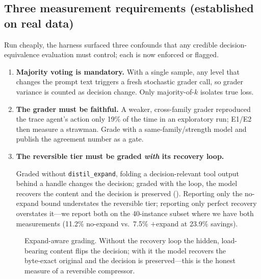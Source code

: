 \documentclass[11pt]{article}
\begin{document}
\subsection{Three measurement requirements (established on real data)}
Run cheaply, the harness surfaced three confounds that any credible
decision-equivalence evaluation must control; each is now enforced or flagged.
\begin{enumerate}
  \item \textbf{Majority voting is mandatory.} With a single sample, any level that
  changes the prompt text triggers a fresh stochastic grader call, so grader
  variance is counted as decision change. Only majority-of-$k$ isolates true loss.
  \item \textbf{The grader must be faithful.} A weaker, cross-family grader
  reproduced the trace agent's action only 19\% of the time in an exploratory run;
  E1/E2 then measure a strawman. Grade with a same-family/strength model and publish
  the agreement number as a gate.
  \item \textbf{The reversible tier must be graded \emph{with} its recovery loop.}
  {\sloppy
  Graded without \texttt{distil\_expand}, folding a decision-relevant tool output
  behind a handle changes the decision; graded with the loop, the model recovers the
  content and the decision is preserved (). Reporting only the
  no-expand bound understates the reversible tier; reporting only perfect recovery
  overstates it---we report both on the 40-instance subset where we have both
  measurements (11.2\% no-expand vs.\ 7.5\% $+$expand at 23.9\% savings).\par}
\end{enumerate}

\begin{figure}[t]
\centering
{}
\caption{Expand-aware grading. Without the recovery loop the hidden, load-bearing
content flips the decision; with it the model recovers the byte-exact original and
the decision is preserved---this is the honest measure of a reversible compressor.}
\label{fig:expand}
\end{figure}
\end{document}
